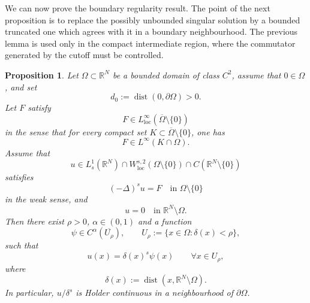 \documentclass[11pt,a4paper]{article}
\newtheorem{proposition}[theorem]{Proposition}
\newcommand{\loc}{\mathrm{loc}}
\begin{document}
We can now prove the boundary regularity result. The point of the next proposition
is to replace the possibly unbounded singular solution by a bounded truncated
one which agrees with it in a boundary neighbourhood. The previous lemma is used only
in the compact intermediate region, where the commutator generated by the
cutoff must be controlled.

\begin{proposition}
\label{boundary regularity}
Let \(\Omega\subset\mathbb R^N\) be a bounded domain of class \(C^{2}\), assume that
\(0\in\Omega\), and set
\[
d_0:=\operatorname{dist}(0,\partial\Omega)>0.
\]
Let \(F\) satisfy
\begin{equation}\label{eq: boundary regularity}
F\in L^\infty_{\loc}(\overline\Omega\setminus\{0\})
\end{equation}
in the sense that for every compact set
\(K\subset\overline\Omega\setminus\{0\}\), one has
\[
F\in L^\infty(K\cap\Omega).
\]
Assume that
\begin{equation}\label{eq:u regularity}
u\in L^1_s(\mathbb R^N)
\cap W^{s,2}_{\mathrm{loc}}(\Omega\setminus\{0\})
\cap C(\mathbb R^N\setminus\{0\})
\end{equation}
satisfies
\begin{equation}\label{eq:equazione u}
(-\Delta)^s u=F
\quad\text{in }\Omega\setminus\{0\}
\end{equation}
in the weak sense, and
\begin{equation}\label{eq: exterior Dirichlet}
u=0
\quad\text{in }\mathbb R^N\setminus\Omega.
\end{equation}
Then there exist \(\rho>0\), \(\alpha\in(0,1)\) and a function
\[
\psi\in C^\alpha(\overline{U_\rho}),
\qquad
U_\rho:=\{x\in\Omega:\delta(x)<\rho\},
\]
such that
\[
u(x)=\delta(x)^s\psi(x)
\qquad\forall x \in U_\rho,
\]
where
\[
\delta(x):=\operatorname{dist}(x,\mathbb R^N\setminus\Omega).
\]
In particular, \(u/\delta^s\) is Holder continuous in a neighbourhood of
\(\partial\Omega\).
\end{proposition}
\end{document}
